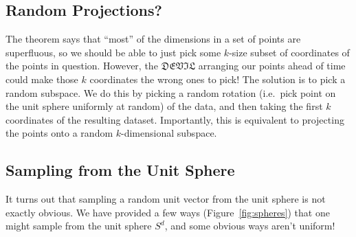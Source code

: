 \documentclass[11pt]{article}
\begin{document}
\subsection{Random Projections?}

The theorem says that ``most'' of the dimensions in a set of points are
superfluous, so we should be able to just pick some $k$-size subset of
coordinates of the points in question. However, the $\mathfrak{DEVIL}$ arranging
our points ahead of time could make those $k$ coordinates the wrong ones to
pick! The solution is to pick a random subspace. We do this by picking a random
rotation (i.e.~pick point on the unit sphere uniformly at random)
of the data, and then taking the first $k$ coordinates of the resulting dataset.
Importantly, this is equivalent to projecting the points onto a random
$k$-dimensional subspace.





\subsection{Sampling from the Unit Sphere}
It turns out that sampling a random unit vector from the unit sphere is not
exactly obvious. We have provided a few ways (Figure~\ref{fig:spheres}) that one
might sample from the unit sphere $S^d$, and some obvious ways aren't uniform!
\end{document}
